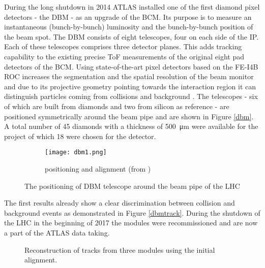 During the long shutdown in 2014 ATLAS installed one of the first diamond pixel detectors - the \ac{DBM} - as an upgrade of the \ac{BCM}. Its purpose is to measure an instantaneous (bunch-by-bunch) luminosity and the bunch-by-bunch position of the beam spot. The \ac{DBM} consists of eight telescopes, four on each side of the \ac{IP}. Each of these telescopes comprises three detector planes. This adds tracking capability to the existing precise \ac{ToF} measurements of the original eight pad detectors of the \ac{BCM}. Using state-of-the-art pixel detectors based on the FE-I4B \ac{ROC} \cite{malte} increases the segmentation and the spatial resolution of the beam monitor and due to its projective geometry pointing towards the interaction region it can distinguish particles coming from collisions and background \cite{dbm}. The telescopes - six of which are built from \pcvd diamonds and two from silicon as reference - are positioned symmetrically around the beam pipe and are shown in Figure \vref{dbm}. A total number of 45 diamonds with a thickness of \SI{500}{\micro\meter} were available for the project of which 18 were chosen for the detector.

\begin{figure}
	\centering
	\begin{subfigure}{.66\textwidth}
		\centering
		\vspace*{.05\textheight}
		\texttt{[image: dbm1.png]}
		\vspace*{.02\textheight}
		\caption{positioning and alignment (from \cite{dbm})}
	\end{subfigure}
	\caption{The positioning of \ac{DBM} telescope around the beam pipe of the \ac{LHC}}
	\label{dbm}
\end{figure}

\noindent
The first results already show a clear discrimination between collision and background events as demonstrated in Figure \vref{dbmtrack}. During the shutdown of the \ac{LHC} in the beginning of 2017 the modules were recommissioned and are now a part of the ATLAS data taking.

\begin{figure}
	\centering
	\caption{Reconstruction of tracks from three modules using the initial alignment.}
	\label{dbmtrack}
\end{figure}

